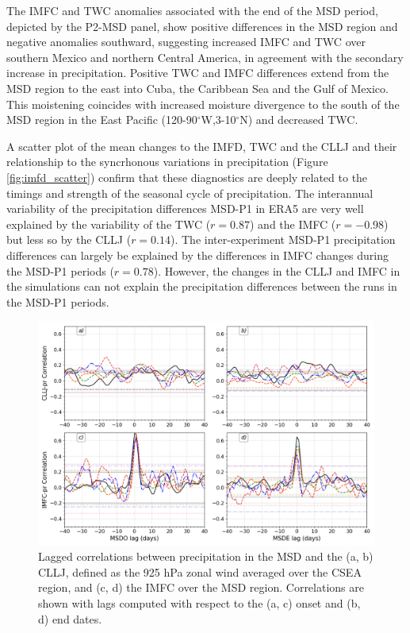 The IMFC and TWC anomalies associated with the end of the MSD period, depicted by the P2-MSD panel,  show positive differences in the MSD region and negative anomalies southward, suggesting increased IMFC and TWC over southern Mexico and northern Central America, in agreement with the secondary increase in precipitation. Positive TWC and IMFC differences extend from the MSD region to the east into Cuba, the Caribbean Sea and the Gulf of Mexico. This moistening coincides with increased moisture divergence to the south of the MSD region in the East Pacific (120-90$^\circ$W,3-10$^\circ$N) and decreased TWC. 


A scatter plot of the mean changes to the IMFD, TWC and the CLLJ and their relationship to the syncrhonous variations in precipitation (Figure \ref{fig:imfd_scatter}) confirm that these diagnostics are deeply related to the timings and strength of the seasonal cycle of precipitation. The interannual variability of the precipitation differences MSD-P1 in ERA5  are very well explained by the variability of the TWC ($r=0.87$) and the IMFC ($r=-0.98$) but less so by the CLLJ ($r=0.14$). The inter-experiment MSD-P1 precipitation differences can largely be explained by the differences in IMFC changes during the MSD-P1 periods ($r=0.78$). However, the changes in the CLLJ and IMFC in the simulations can not explain the precipitation differences between the runs in the MSD-P1 periods. 

\begin{figure}[t!]
\includegraphics[width=\linewidth]{figures/lag_imfdcllj.png}
\caption[Lagged correlations of the CLLJ and IMFC indices with precipitation.]{Lagged correlations between precipitation in the MSD and the (a, b) CLLJ, defined as the 925 hPa zonal wind averaged over the CSEA region, and (c, d) the IMFC over the MSD region. Correlations are shown with lags computed with respect to the (a, c) onset and (b, d) end dates.  }
\label{fig:cllj_lag}
\end{figure}

